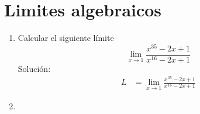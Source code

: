 \section{Limites algebraicos}
\begin{enumerate}
    \item Calcular el siguiente límite
    \[\lim_{x\to 1}\frac{x^{35}-2x+1}{x^{16}-2x+1}\]
    Solución:
    \begin{align*}
        L&=\lim_{x \to 1}\frac{x^{35}-2x+1}{x^{16}-2x+1}
    \end{align*}
    \item 
\end{enumerate}
